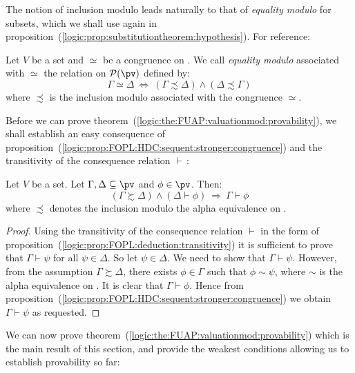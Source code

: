 The notion of inclusion modulo leads naturally to that of {\em
equality modulo} for subsets, which we shall use again in
proposition~(\ref{logic:prop:substitutiontheorem:hypothesis}). For
reference:

\begin{defin}\label{logic:def:FUAP:valuationmod:equality:modulo}
Let $V$ be a set and $\simeq$ be a congruence on \pv. We call {\em
equality modulo} associated with $\simeq$ the relation on ${\cal
P}(\pv)$ defined by:
    \[
    \Gamma\simeq\Delta\ \Leftrightarrow\
    (\Gamma\precsim\Delta)\land(\Delta\precsim\Gamma)
    \]
where $\precsim$ is the inclusion modulo associated with the
congruence $\simeq$.
\end{defin}

Before we can prove
theorem~(\ref{logic:the:FUAP:valuationmod:provability}), we shall
establish an easy consequence of
proposition~(\ref{logic:prop:FOPL:HDC:sequent:stronger:congruence})
and the transitivity of the consequence relation $\vdash$\,:

\begin{prop}\label{logic:prop:FUAP:valuationmod:hypothesis:modulo}
Let $V$ be a set. Let $\Gamma, \Delta\subseteq\pv$ and $\phi\in\pv$.
Then:
    \[
    (\Gamma\succsim\Delta)\land(\Delta\vdash\phi)\ \Rightarrow\
    \Gamma\vdash\phi
    \]
where $\precsim$ denotes the inclusion modulo the alpha equivalence on \pv.
\end{prop}
\begin{proof}
Using the transitivity of the consequence relation $\vdash$ in the
form of proposition~(\ref{logic:prop:FOPL:deduction:transitivity})
it is sufficient to prove that $\Gamma\vdash\psi$ for all
$\psi\in\Delta$. So let $\psi\in\Delta$. We need to show that
$\Gamma\vdash\psi$. However, from the assumption
$\Gamma\succsim\Delta$, there exists $\phi\in\Gamma$ such that
$\phi\sim\psi$, where $\sim$ is the alpha equivalence on \pv.
It is clear that $\Gamma\vdash\phi$. Hence from
proposition~(\ref{logic:prop:FOPL:HDC:sequent:stronger:congruence})
we obtain $\Gamma\vdash\psi$ as requested.
\end{proof}

We can now prove
theorem~(\ref{logic:the:FUAP:valuationmod:provability}) which is the
main result of this section, and provide the weakest conditions
allowing us to establish provability so far:

